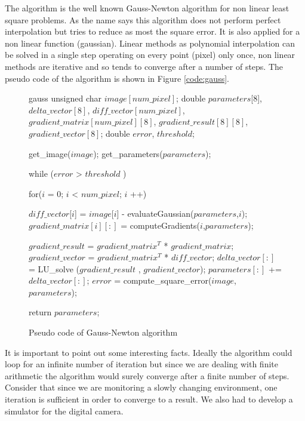 The algorithm is the well known Gauss-Newton algorithm for non linear least square problems.
As the name says this algorithm does not perform perfect interpolation but tries to reduce as most the square error.
It is also applied for a non linear function (gaussian).
Linear methods as polynomial interpolation can be solved in a single step operating on every point (pixel) only once, non linear methods are iterative and so tends to converge after a  number of steps.
The pseudo code of the algorithm is shown in Figure \ref{code:gauss}.

\begin{figure}[h]
\begin{center} 
\begin{minipage}[c]{.85\textwidth} 
\centering 
\begin{pseudo}{}{gauss}
unsigned char $image[num\_pixel]$;
double $parameters$[8], $delta\_vector[8]$, $diff\_vector[num\_pixel]$, $gradient\_matrix[num\_pixel][8]$, $gradient\_result[8][8]$, $gradient\_vector[8]$;
double $error$, $threshold$;

get_image($image$);
get_parameters($parameters$);

while ($error$ > $threshold$ ) {
    for($i$ = 0; $i$ < $num\_pixel$; $i$ ++){
	
          $diff\_vector$[$i$] = $image$[$i$] - evaluateGaussian($parameters$,$i$); 
          $gradient\_matrix[i][:]$ = computeGradients($i$,$parameters$);
	      
    }
    $gradient\_result$ = $gradient\_matrix^T$ * $gradient\_matrix$;
    $gradient\_vector$ = $gradient\_matrix^T$ * $diff\_vector$;
    $delta\_vector[:]$ = LU_solve ($gradient\_result$ , $gradient\_vector$);
    $parameters[:]$ += $delta\_vector[:]$;
    $error$ = compute_square_error($image$, $parameters$);
}
return $parameters$;

\end{pseudo}
\end{minipage} 
\end{center} 
\caption{Pseudo code of Gauss-Newton algorithm}
\end{figure}

It is important to point out some interesting facts.
Ideally the algorithm could loop for an infinite number of iteration but since we are dealing with finite arithmetic the algorithm would surely converge after a finite number of steps.
Consider that since we are monitoring a slowly changing environment, one iteration is sufficient in order to converge to a result.
We also had to develop a simulator for the digital camera.

